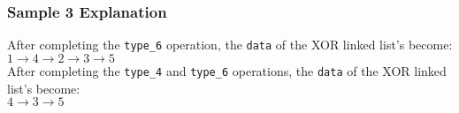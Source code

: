\subsubsection{Sample 3 Explanation}\label{sample-3-explanation}

After completing the \texttt{type\_6} operation, the \texttt{data} of the XOR linked list's become: \\
$1\rightarrow 4\rightarrow 2\rightarrow 3\rightarrow 5$ \\
After completing the \texttt{type\_4} and \texttt{type\_6} operations, the \texttt{data} of the XOR linked list's become: \\
$4\rightarrow 3\rightarrow 5$

